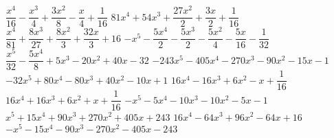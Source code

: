 \begin{esercizio}
\begin{htmulticols}{4}
\begin{enumeratea}
\end{enumeratea}
\end{htmulticols}
\noindent\! 
\(\dfrac{x^{4}}{16} - \dfrac{x^{3}}{4} + \dfrac{3 x^{2}}{8} - 
          \dfrac{x}{4} + \dfrac{1}{16}\)
 \(81 x^{4} + 54 x^{3} + \dfrac{27 x^{2}}{2} + \dfrac{3 x}{2} + 
          \dfrac{1}{16}\) \\
 \(\dfrac{x^{4}}{81} + \dfrac{8 x^{3}}{27} + \dfrac{8 x^{2}}{3} 
              + \dfrac{32 x}{3} + 16\)
 \(- x^{5} - \dfrac{5 x^{4}}{2} - \dfrac{5 x^{3}}{2} - \dfrac{5 
          x^{2}}{4} - \dfrac{5 x}{16} - \dfrac{1}{32}\) \\ %
 \(\dfrac{x^{5}}{32} - \dfrac{5 x^{4}}{8} + 5 x^{3} - 20 x^{2} + 
              40x - 32\) %
 \(- 243 x^{5} - 405 x^{4} - 270 x^{3} - 90 x^{2} - 15 x - 1\)%
 \(- 32 x^{5} + 80 x^{4} - 80 x^{3} + 40 x^{2} - 10 x + 1\) %
 \(16 x^{4} - 16 x^{3} + 6 x^{2} - x + \dfrac{1}{16}\) \\ %
 \(16 x^{4} + 16 x^{3} + 6 x^{2} + x + \dfrac{1}{16}\) %
 \(- x^{5} - 5 x^{4} - 10 x^{3} - 10 x^{2} - 5 x - 1\) \\ %
 \(x^{5} + 15 x^{4} + 90 x^{3} + 270 x^{2} + 405 x + 243\) %
 \(16 x^{4} - 64 x^{3} + 96 x^{2} - 64 x + 16\)  %
 \(- x^{5} - 15 x^{4} - 90 x^{3} - 270 x^{2} - 405 x - 243\) %
\end{esercizio}

